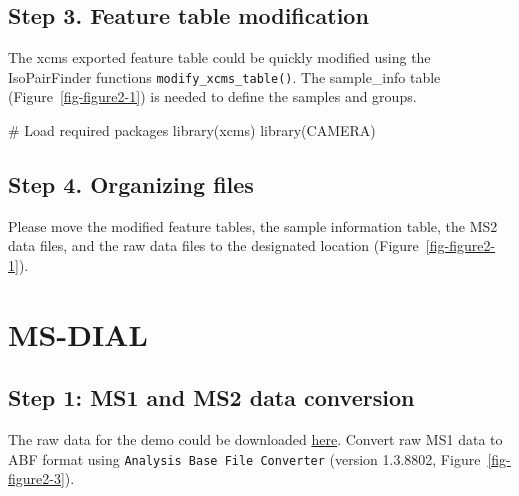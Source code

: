 \documentclass[
  letterpaper,
  DIV=11,
  numbers=noendperiod]{scrreprt}
\newenvironment{Shaded}{\begin{snugshade}}{\end{snugshade}}
\newcommand{\CommentTok}[1]{\textcolor[rgb]{0.37,0.37,0.37}{#1}}
\newcommand{\FunctionTok}[1]{\textcolor[rgb]{0.28,0.35,0.67}{#1}}
\newcommand{\NormalTok}[1]{\textcolor[rgb]{0.00,0.23,0.31}{#1}}
\begin{document}
\subsection{Step 3. Feature table
modification}\label{step-3.-feature-table-modification}

The xcms exported feature table could be quickly modified using the
IsoPairFinder functions \texttt{modify\_xcms\_table()}. The sample\_info
table (Figure~\ref{fig-figure2-1}) is needed to define the samples and
groups.

\begin{Shaded}
\begin{Highlighting}[]
\CommentTok{\# Load required packages}
\FunctionTok{library}\NormalTok{(xcms)}
\FunctionTok{library}\NormalTok{(CAMERA)}
\end{Highlighting}
\end{Shaded}

\subsection{Step 4. Organizing files}\label{step-4.-organizing-files}

Please move the modified feature tables, the sample information table,
the MS2 data files, and the raw data files to the designated location
(Figure~\ref{fig-figure2-1}).

\section{MS-DIAL}\label{sec-msdial}

\subsection{Step 1: MS1 and MS2 data
conversion}\label{step-1-ms1-and-ms2-data-conversion}

The raw data for the demo could be downloaded
\href{https://github.com/DoddLab/IsoPairFinder_DemoData_DiffTools/tree/main/00_raw_data}{here}.
Convert raw MS1 data to ABF format using
\texttt{Analysis\ Base\ File\ Converter} (version 1.3.8802,
Figure~\ref{fig-figure2-3}).
\end{document}
